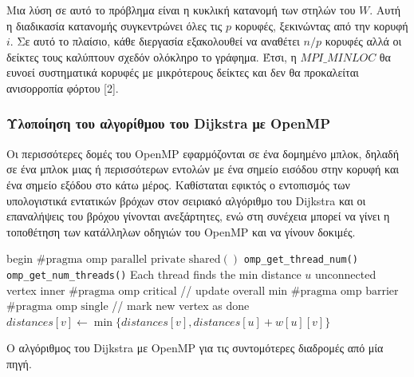 \documentclass[12pt,a4paper]{article}
\begin{document}
Μια λύση σε αυτό το πρόβλημα είναι η κυκλική κατανομή των στηλών του $W$. Αυτή η διαδικασία κατανομής συγκεντρώνει όλες τις $p$ κορυφές, ξεκινώντας από την κορυφή $i$. Σε αυτό το πλαίσιο, κάθε διεργασία εξακολουθεί να αναθέτει $n/p$ κορυφές αλλά οι δείκτες τους καλύπτουν σχεδόν ολόκληρο το γράφημα. Έτσι, η \texttt{$MPI\_MINLOC$} θα ευνοεί συστηματικά κορυφές με μικρότερους δείκτες και δεν θα προκαλείται ανισορροπία φόρτου [2].

\subsubsection{Υλοποίηση του αλγορίθμου του \foreignlanguage{english}{Dijkstra} με \foreignlanguage{english}{OpenMP}}

Οι περισσότερες δομές του \foreignlanguage{english}{OpenMP} εφαρμόζονται σε ένα δομημένο μπλοκ, δηλαδή σε ένα μπλοκ μιας ή περισσότερων εντολών με ένα σημείο εισόδου στην κορυφή και ένα σημείο εξόδου στο κάτω μέρος. Καθίσταται εφικτός ο εντοπισμός των υπολογιστικά εντατικών βρόχων στον σειριακό αλγόριθμο του \foreignlanguage{english}{Dijkstra} και οι επαναλήψεις του βρόχου γίνονται ανεξάρτητες, ενώ στη συνέχεια μπορεί να γίνει η τοποθέτηση των κατάλληλων οδηγιών του \foreignlanguage{english}{OpenMP} και να γίνουν δοκιμές.

\begin{algorithm}[H]
\begin{algorithmic}[1]
    \State begin
        \State $\#\text{pragma omp parallel private}$
        \State $\text{shared}()$
        \State \texttt{omp\_get\_thread\_num()}
        \State \texttt{omp\_get\_num\_threads()}
        \State Each thread finds the min distance $u$ unconnected vertex inner
        \State $\#\text{pragma omp critical}$ \quad // update overall min
        \State $\#\text{pragma omp barrier}$
        \State $\#\text{pragma omp single}$ \quad // mark new vertex as done
            \State $distances[v] \gets \min\{distances[v], distances[u] + w[u][v]\}$
        \EndFor
    \EndWhile
\EndProcedure
\end{algorithmic}
\end{algorithm}


{\raggedright{} Ο αλγόριθμος του \foreignlanguage{english}{Dijkstra} με \foreignlanguage{english}{OpenMP} για τις συντομότερες διαδρομές από μία πηγή.\label{alg:dijkstra3}\par}
\vspace{0.3cm}
\end{document}
